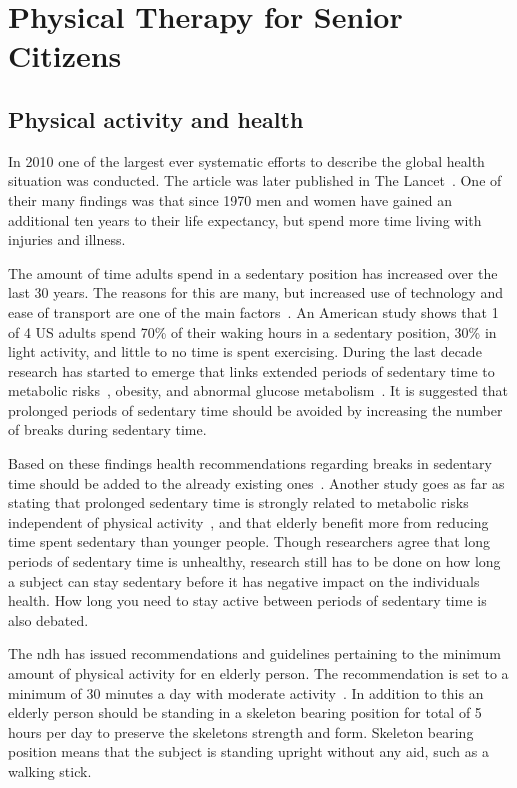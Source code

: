 \chapter{Physical Therapy for Senior Citizens}

\section{Physical activity and health}
In 2010 one of the largest ever systematic efforts to describe the global health situation was conducted. The article was later published in The Lancet~\cite{globalBurden}. One of their many findings was that since 1970 men and women have gained an additional ten years to their life expectancy, but spend more time living with injuries and illness. 

The amount of time adults spend in a sedentary position has increased over the last 30 years. The reasons for this are many, but increased use of technology and ease of transport are one of the main factors~\cite{sedentaryBehaviour}. An American study shows that 1 of 4 US adults spend 70\% of their waking hours in a sedentary position, 30\% in light activity, and little to no time is spent exercising. During the last decade research has started to emerge that links extended periods of sedentary time to metabolic risks~\cite{sedentaryTime}, obesity, and abnormal glucose metabolism~\cite{breaksSedentary}. It is suggested that prolonged periods of sedentary time should be avoided by increasing the number of breaks during sedentary time. 

Based on these findings health recommendations regarding breaks in sedentary time should be added to the already existing ones~\cite{breaksSedentary}. Another study goes as far as stating that prolonged sedentary time is strongly related to metabolic risks independent of physical activity~\cite{sedentaryActivity}, and that elderly benefit more from reducing time spent sedentary than younger people. Though researchers agree that long periods of sedentary time is unhealthy, research still has to be done on how long a subject can stay sedentary before it has negative impact on the individuals health. How long you need to stay active between periods of sedentary time is also debated.

The \gls{ndh} has issued recommendations and guidelines pertaining to the minimum amount of physical activity for en elderly person. The recommendation is set to a minimum of 30 minutes a day with moderate activity~\cite{helsedirektoratetFysiskAktivitet}. In addition to this an elderly person should be standing in a skeleton bearing position for total of 5 hours per day to preserve the skeletons strength and form. Skeleton bearing position means that the subject is standing upright without any aid, such as a walking stick.

